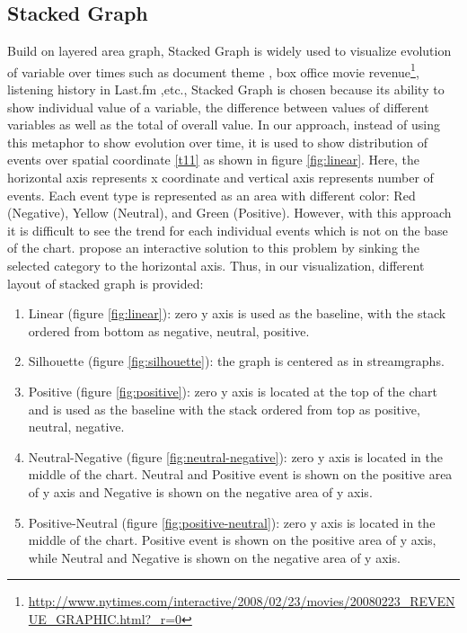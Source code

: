 \subsection{Stacked Graph}
Build on layered area graph, Stacked Graph is widely used to visualize evolution of variable over times such as document theme \cite{havre}, box office movie revenue\footnote{\url{http://www.nytimes.com/interactive/2008/02/23/movies/20080223_REVENUE_GRAPHIC.html?_r=0}}, listening history in Last.fm \cite{byron},etc., Stacked Graph is chosen because its ability to show individual value of a variable, the difference between values of different variables as well as the total of overall value. In our approach, instead of using this metaphor to show evolution over time, it is used to show distribution of events over spatial coordinate \ref{t11} as shown in figure \ref{fig:linear}. Here, the horizontal axis represents x coordinate and vertical axis represents number of events. Each event type is represented as an area with different color: Red (Negative), Yellow (Neutral), and Green (Positive). However, with this approach it is difficult to see the trend for each individual events which is not on the base of the chart. \cite{alan} propose an interactive solution to this problem by sinking the selected category to the horizontal axis. Thus, in our visualization, different layout of stacked graph is provided: 
\begin{enumerate}
  \item Linear (figure \ref{fig:linear}): zero y axis is used as the baseline, with the stack ordered from bottom as negative, neutral, positive.
  \item Silhouette (figure \ref{fig:silhouette}): the graph is centered as in streamgraphs.
  \item Positive (figure \ref{fig:positive}): zero y axis is located at the top of the chart and is used as the baseline with the stack ordered from top as positive, neutral, negative.
  \item Neutral-Negative (figure \ref{fig:neutral-negative}): zero y axis is located in the middle of the chart. Neutral and Positive event is shown on the positive area of y axis and Negative is shown on the negative area of y axis.
  \item Positive-Neutral (figure \ref{fig:positive-neutral}): zero y axis is located in the middle of the chart. Positive event is shown on the positive area of y axis, while Neutral and Negative is shown on the negative area of y axis.
\end{enumerate}

